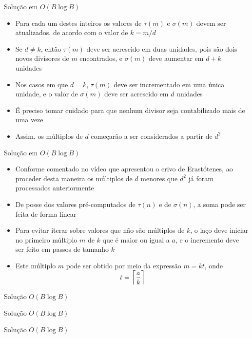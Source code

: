 \begin{frame}[fragile]{Solução em $O(B\log B)$}

    \begin{itemize}
        \item Para cada um destes inteiros os valores de $\tau(m)$ e $\sigma(m)$ devem ser 
            atualizados, de acordo com o valor de $k = m/d$

        \item Se $d\neq k$, então $\tau(m)$ deve ser acrescido em duas unidades, pois são
            dois novos divisores de $m$ encontrados, e $\sigma(m)$ deve aumentar em $d + k$
            unidades

        \item Nos casos em que $d = k$, $\tau(m)$ deve ser incrementado em uma única unidade,
            e o valor de $\sigma(m)$ deve ser acrescido em $d$ unidades

        \item É preciso tomar cuidado para que nenhum divisor seja contabilizado mais de uma 
            veze

        \item Assim, os múltiplos de $d$ começarão a ser considerados a partir de $d^2$
    \end{itemize}

\end{frame}

\begin{frame}[fragile]{Solução em $O(B\log B)$}

    \begin{itemize}
        \item Conforme comentado no vídeo que apresentou o crivo de Erastótenes, ao proceder
            desta maneira os múltiplos de $d$ menores que $d^2$ já foram processados anteriormente

        \item De posse dos valores pré-computados de $\tau(n)$ e de $\sigma(n)$, a soma pode
            ser feita de forma linear 

        \item Para evitar iterar sobre valores que não são múltiplos de $k$, o laço deve iniciar
            no primeiro múltiplo $m$ de $k$ que é maior ou igual a $a$, e o incremento deve ser feito
            em passos de tamanho $k$

        \item Este múltiplo $m$ pode ser obtido por meio da expressão $m = kt$, onde
        $$
            t = \left\lceil \frac{a}{k} \right\rceil
        $$
    \end{itemize}

\end{frame}
\begin{frame}[fragile]{Solução $O(B\log B)$}
\end{frame}

\begin{frame}[fragile]{Solução $O(B\log B)$}
\end{frame}

\begin{frame}[fragile]{Solução $O(B\log B)$}
\end{frame}
